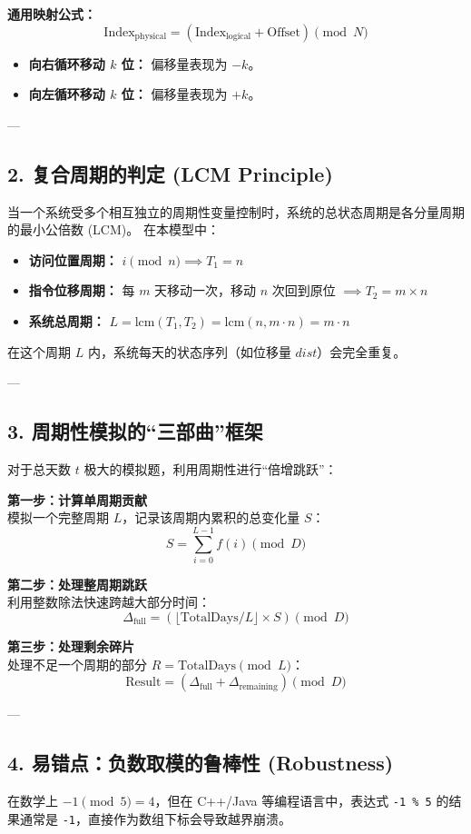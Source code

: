 \begin{itemize}
\textbf{通用映射公式：}
\[ \text{Index}_{\text{physical}} = (\text{Index}_{\text{logical}} + \text{Offset}) \pmod N \]
\begin{itemize}
	\item \textbf{向右循环移动 $k$ 位：} 偏移量表现为 $-k$。
	\item \textbf{向左循环移动 $k$ 位：} 偏移量表现为 $+k$。
\end{itemize}

---

\subsection*{2. 复合周期的判定 (LCM Principle)}
当一个系统受多个相互独立的周期性变量控制时，系统的总状态周期是各分量周期的最小公倍数 (LCM)。
在本模型中：
\begin{itemize}
	\item \textbf{访问位置周期：} $i \pmod n \implies T_1 = n$
	\item \textbf{指令位移周期：} 每 $m$ 天移动一次，移动 $n$ 次回到原位 $\implies T_2 = m \times n$
	\item \textbf{系统总周期：} $L = \text{lcm}(T_1, T_2) = \text{lcm}(n, m \cdot n) = m \cdot n$
\end{itemize}
在这个周期 $L$ 内，系统每天的状态序列（如位移量 $dist$）会完全重复。

---

\subsection*{3. 周期性模拟的“三部曲”框架}
对于总天数 $t$ 极大的模拟题，利用周期性进行“倍增跳跃”：

\textbf{第一步：计算单周期贡献} \\
模拟一个完整周期 $L$，记录该周期内累积的总变化量 $S$：
\[ S = \sum_{i=0}^{L-1} f(i) \pmod D \]

\textbf{第二步：处理整周期跳跃} \\
利用整数除法快速跨越大部分时间：
\[ \Delta_{\text{full}} = (\lfloor \text{TotalDays} / L \rfloor \times S) \pmod D \]

\textbf{第三步：处理剩余碎片} \\
处理不足一个周期的部分 $R = \text{TotalDays} \pmod L$：
\[ \text{Result} = (\Delta_{\text{full}} + \Delta_{\text{remaining}}) \pmod D \]

---

\subsection*{4. 易错点：负数取模的鲁棒性 (Robustness)}
在数学上 $-1 \pmod 5 = 4$，但在 C++/Java 等编程语言中，表达式 \texttt{-1 \% 5} 的结果通常是 \texttt{-1}，直接作为数组下标会导致越界崩溃。\\


\end{itemize}
